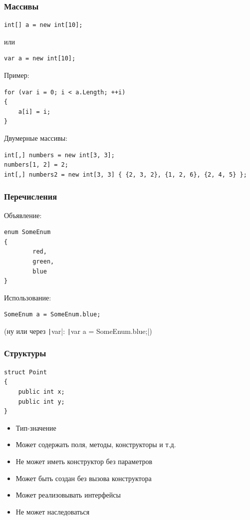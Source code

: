 \documentclass[xetex,mathserif,serif]{beamer}
\begin{document}
	\begin{frame}[fragile]
		\frametitle{Массивы}
		\begin{verbatim}
int[] a = new int[10];
		\end{verbatim}
		или
		\begin{verbatim}
var a = new int[10];
		\end{verbatim}
		Пример:
		\begin{verbatim}
for (var i = 0; i < a.Length; ++i)
{
    a[i] = i;
}
		\end{verbatim}
		Двумерные массивы:
		\begin{verbatim}
int[,] numbers = new int[3, 3];
numbers[1, 2] = 2; 
int[,] numbers2 = new int[3, 3] { {2, 3, 2}, {1, 2, 6}, {2, 4, 5} };
		\end{verbatim}
\end{frame}

	\begin{frame}[fragile]
		\frametitle{Перечисления}
		Объявление:
		\begin{verbatim}
enum SomeEnum
{
        red,
        green,
        blue
}
		\end{verbatim}
		Использование:
		\begin{verbatim}
SomeEnum a = SomeEnum.blue;
		\end{verbatim}
		(ну или через \texttt|var|: \texttt|var a = SomeEnum.blue;|)
\end{frame}

	\begin{frame}[fragile]
		\frametitle{Структуры}
		\begin{verbatim}
struct Point
{
    public int x;
    public int y;
}
		\end{verbatim}
		\begin{itemize}
			\item Тип-значение
			\item Может содержать поля, методы, конструкторы и т.д.
			\item Не может иметь конструктор без параметров
			\item Может быть создан без вызова конструктора
			\item Может реализовывать интерфейсы
			\item Не может наследоваться
		\end{itemize}
\end{frame}
\end{document}

